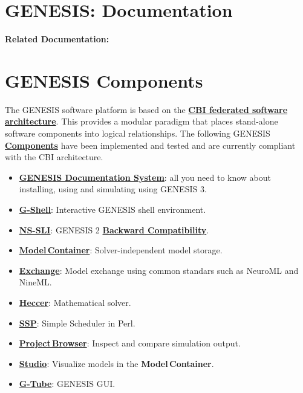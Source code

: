 \documentclass[12pt]{article}
\begin{document}
\section*{GENESIS: Documentation}

{\bf Related Documentation:}

\section*{GENESIS Components}

The GENESIS software platform is based on the \href{../genesis-overview/genesis-overview.tex}{\bf CBI federated software architecture}. This provides a modular paradigm that places stand-alone software components into logical relationships. The following GENESIS \href{../reserved-words/reserved-words.tex}{\bf Components} have been implemented and tested and are currently compliant with the CBI architecture.

\begin{itemize}
   \item[]\href{../documentation-overview/documentation-overview.tex}{\bf GENESIS Documentation System}: all you need to know about installing, using and simulating using GENESIS 3.
   \item[]\href{../gshell/gshell.tex}{\bf G-Shell}: Interactive GENESIS shell environment.
   \item[]\href{../nssli/nssli.tex}{\bf NS-SLI}: GENESIS 2 \href{../backward-compatibility/backward-compatibility.tex}{\bf Backward Compatibility}.
   \item[]\href{../model-container/model-container.tex}{\bf Model\,Container}: Solver-independent model storage.
   \item[]\href{../exchange/exchange.tex}{\bf Exchange}: Model exchange using common standars such as NeuroML and NineML.
   \item[]\href{../heccer/heccer.tex}{\bf Heccer}: Mathematical solver.
   \item[]\href{../ssp/ssp.tex}{\bf SSP}: Simple Scheduler in Perl.
   \item[]\href{../project-browser/project-browser.tex}{\bf Project\,Browser}: Inspect and compare simulation output.
   \item[]\href{../studio/studio.tex}{\bf Studio}: Visualize models in the {\bf Model\,Container}.
   \item[]\href{../gtube/gtube.tex}{\bf G-Tube}: GENESIS GUI.
\end{itemize}
\end{document}
